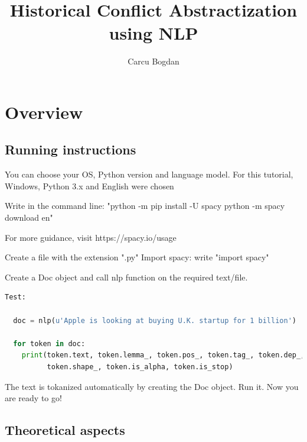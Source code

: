 \documentclass[a4paper,10pt]{article}
\title{Historical Conflict Abstractization using NLP}
\author{Carcu Bogdan}
\begin{document}
\maketitle

\tableofcontents
\section{Overview}

 \subsection{Running instructions}
 You can choose your OS, Python version and language model.
 For this tutorial, Windows, Python 3.x and English were chosen

 Write in the command line:
 "python -m pip install -U spacy
  python -m spacy download en"

  For more guidance, visit https://spacy.io/usage

  Create a file with the extension ".py"
  Import spacy: write "import spacy"

  Create a Doc object and call nlp function on the required text/file.
 \begin{lstlisting}[language=Python]
  Test:

  doc = nlp(u'Apple is looking at buying U.K. startup for 1 billion')

  for token in doc:
    print(token.text, token.lemma_, token.pos_, token.tag_, token.dep_,
          token.shape_, token.is_alpha, token.is_stop)

 \end{lstlisting}
  The text is tokanized automatically by creating the Doc object.
  Run it. Now you are ready to go!
 
 \subsection{Theoretical aspects}
\end{document}

